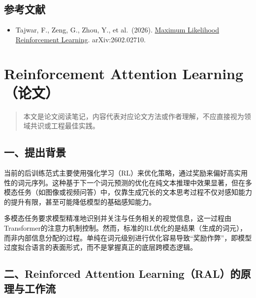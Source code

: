 \hypertarget{ux53c2ux8003ux6587ux732e-111}{%
\subsection{参考文献}\label{ux53c2ux8003ux6587ux732e-111}}

\begin{itemize}
\tightlist
\item
  Tajwar, F., Zeng, G., Zhou, Y., et al.~(2026). \href{https://arxiv.org/abs/2602.02710}{Maximum Likelihood Reinforcement Learning}. arXiv:2602.02710.
\end{itemize}

\clearpage

\hypertarget{reinforcement-attention-learningux8bbaux6587}{%
\section{Reinforcement Attention Learning（论文）}\label{reinforcement-attention-learningux8bbaux6587}}

\begin{quote}
本文是论文阅读笔记，内容代表对应论文方法或作者理解，不应直接视为领域共识或工程最佳实践。
\end{quote}

\hypertarget{ux4e00ux63d0ux51faux80ccux666f-2}{%
\subsection{一、提出背景}\label{ux4e00ux63d0ux51faux80ccux666f-2}}

当前的后训练范式主要使用强化学习（RL）来优化策略，通过奖励来偏好高实用性的词元序列。这种基于下一个词元预测的优化在纯文本推理中效果显著，但在多模态任务（如图像或视频问答）中，仅靠生成冗长的文本思考过程不仅对感知能力的提升有限，甚至可能降低模型的基础感知能力。

多模态任务要求模型精准地识别并关注与任务相关的视觉信息，这一过程由Transformer的注意力机制控制。然而，标准的RL优化的是结果（生成的词元），而非内部信息分配的过程。单纯在词元级别进行优化容易导致``奖励作弊''，即模型过度拟合语言的表面形式，而不是掌握真正的底层跨模态逻辑。

\hypertarget{ux4e8creinforced-attention-learningralux7684ux539fux7406ux4e0eux5de5ux4f5cux6d41}{%
\subsection{二、Reinforced Attention Learning（RAL）的原理与工作流}\label{ux4e8creinforced-attention-learningralux7684ux539fux7406ux4e0eux5de5ux4f5cux6d41}}

